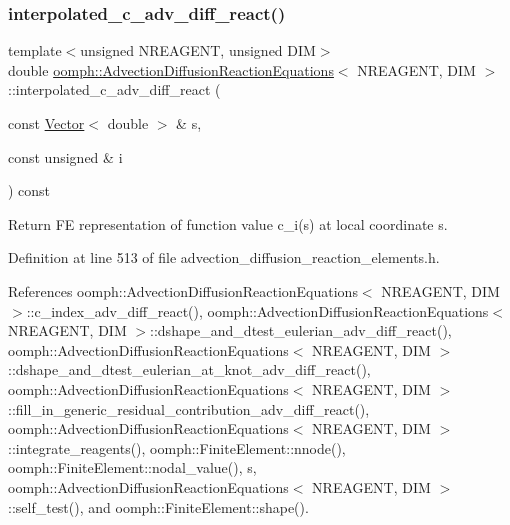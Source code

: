 \subsubsection{\texorpdfstring{interpolated\+\_\+c\+\_\+adv\+\_\+diff\+\_\+react()}{interpolated\_c\_adv\_diff\_react()}}
{\footnotesize\ttfamily template$<$unsigned N\+R\+E\+A\+G\+E\+NT, unsigned D\+IM$>$ \\
double \hyperlink{classoomph_1_1AdvectionDiffusionReactionEquations}{oomph\+::\+Advection\+Diffusion\+Reaction\+Equations}$<$ N\+R\+E\+A\+G\+E\+NT, D\+IM $>$\+::interpolated\+\_\+c\+\_\+adv\+\_\+diff\+\_\+react (\begin{DoxyParamCaption}\item[{const \hyperlink{classoomph_1_1Vector}{Vector}$<$ double $>$ \&}]{s,  }\item[{const unsigned \&}]{i }\end{DoxyParamCaption}) const\hspace{0.3cm}{\ttfamily [inline]}}



Return FE representation of function value c\+\_\+i(s) at local coordinate s. 



Definition at line 513 of file advection\+\_\+diffusion\+\_\+reaction\+\_\+elements.\+h.



References oomph\+::\+Advection\+Diffusion\+Reaction\+Equations$<$ N\+R\+E\+A\+G\+E\+N\+T, D\+I\+M $>$\+::c\+\_\+index\+\_\+adv\+\_\+diff\+\_\+react(), oomph\+::\+Advection\+Diffusion\+Reaction\+Equations$<$ N\+R\+E\+A\+G\+E\+N\+T, D\+I\+M $>$\+::dshape\+\_\+and\+\_\+dtest\+\_\+eulerian\+\_\+adv\+\_\+diff\+\_\+react(), oomph\+::\+Advection\+Diffusion\+Reaction\+Equations$<$ N\+R\+E\+A\+G\+E\+N\+T, D\+I\+M $>$\+::dshape\+\_\+and\+\_\+dtest\+\_\+eulerian\+\_\+at\+\_\+knot\+\_\+adv\+\_\+diff\+\_\+react(), oomph\+::\+Advection\+Diffusion\+Reaction\+Equations$<$ N\+R\+E\+A\+G\+E\+N\+T, D\+I\+M $>$\+::fill\+\_\+in\+\_\+generic\+\_\+residual\+\_\+contribution\+\_\+adv\+\_\+diff\+\_\+react(), oomph\+::\+Advection\+Diffusion\+Reaction\+Equations$<$ N\+R\+E\+A\+G\+E\+N\+T, D\+I\+M $>$\+::integrate\+\_\+reagents(), oomph\+::\+Finite\+Element\+::nnode(), oomph\+::\+Finite\+Element\+::nodal\+\_\+value(), s, oomph\+::\+Advection\+Diffusion\+Reaction\+Equations$<$ N\+R\+E\+A\+G\+E\+N\+T, D\+I\+M $>$\+::self\+\_\+test(), and oomph\+::\+Finite\+Element\+::shape().

\mbox{\label{classoomph_1_1AdvectionDiffusionReactionEquations_a79994ad90aba1dad5fb054d963e696be}} 
